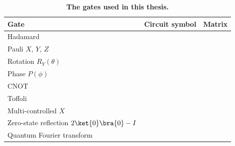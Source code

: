 %

\begin{table}[htbp]
    \centering
    \caption[The gates used in this thesis]{\textbf{The gates used in this thesis.}}
    \label{tab:gates}
    \small
    \begin{tabular}{@{}l l l@{}}
        \toprule
        Gate & Circuit symbol & Matrix \\
        \midrule
        Hadamard & & \\
        Pauli $X$, $Y$, $Z$ & & \\
        Rotation $R_Y(\theta)$ & & \\
        Phase $P(\phi)$ & & \\
        CNOT & & \\
        Toffoli & & \\
        Multi-controlled $X$ & & \\
        Zero-state reflection $2\ket{0}\bra{0} - I$ & & \\
        Quantum Fourier transform & & \\
        \bottomrule
    \end{tabular}
\end{table}


